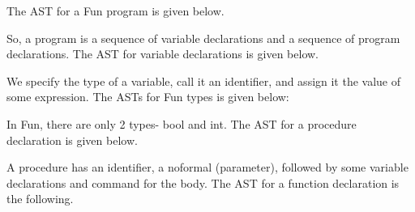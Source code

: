 \documentclass[a4paper, openany]{memoir}
\begin{document}
The AST for a Fun program is given below.
\begin{figure}[H]
    \centering
\end{figure}
\noindent So, a program is a sequence of variable declarations and a sequence of program declarations. The AST for variable declarations is given below.
\begin{figure}[H]
    \centering
\end{figure}
\noindent We specify the type of a variable, call it an identifier, and assign it the value of some expression. The ASTs for Fun types is given below:
\begin{figure}[H]
    \centering
\end{figure}
\noindent In Fun, there are only 2 types- bool and int. The AST for a procedure declaration is given below.
\begin{figure}[H]
    \centering
\end{figure}
\noindent A procedure has an identifier, a noformal (parameter), followed by some variable declarations and command for the body. The AST for a function declaration is the following.
\end{document}
